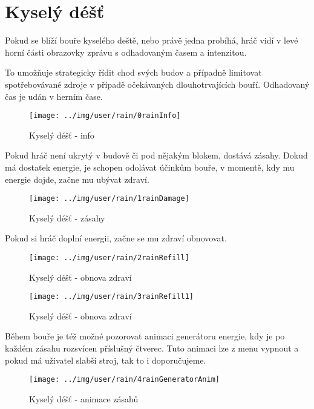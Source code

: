 
\section{Kyselý déšť}

Pokud se blíží bouře kyselého deště, nebo právě jedna probíhá, hráč vidí v levé horní části obrazovky zprávu s odhadovaným časem a intenzitou.

To umožňuje strategicky řídit chod svých budov a případně limitovat spotřebovávané zdroje v případě očekávaných dlouhotrvajících bouří. Odhadovaný čas je udán v herním čase.

\begin{figure}[!ht]\centering
\texttt{[image: ../img/user/rain/0rainInfo]}

\caption{Kyselý déšť - info}
\label{fig:user_rain_0rainInfo}

\end{figure}

\FloatBarrier

Pokud hráč není ukrytý v budově či pod nějakým blokem, dostává zásahy. Dokud má dostatek energie, je schopen odolávat účinkům bouře, v momentě, kdy mu energie dojde, začne mu ubývat zdraví.


\begin{figure}[!ht]\centering
\texttt{[image: ../img/user/rain/1rainDamage]}

\caption{Kyselý déšť - zásahy}
\label{fig:user_rain_1rainDamage}

\end{figure}

\FloatBarrier

Pokud si hráč doplní energii, začne se mu zdraví obnovovat.

\begin{figure}[!ht]\centering
\texttt{[image: ../img/user/rain/2rainRefill]}

\caption{Kyselý déšť - obnova zdraví}
\label{fig:user_rain_2rainRefill}

\end{figure}


\begin{figure}[!ht]\centering
\texttt{[image: ../img/user/rain/3rainRefill1]}

\caption{Kyselý déšť - obnova zdraví}
\label{fig:user_rain_3rainRefill1}

\end{figure}

\FloatBarrier

Během bouře je též možné pozorovat animaci generátoru energie, kdy je po každém zásahu rozsvícen příslušný čtverec. Tuto animaci lze z menu vypnout a pokud má uživatel slabší stroj, tak to i doporučujeme.

\begin{figure}[!ht]\centering
\texttt{[image: ../img/user/rain/4rainGeneratorAnim]}

\caption{Kyselý déšť - animace zásahů}
\label{fig:user_rain_4rainGeneratorAnim}

\end{figure}


\FloatBarrier
